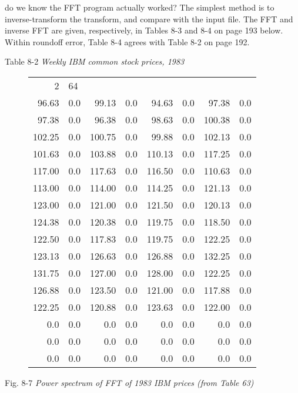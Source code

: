  do we know the FFT program actually worked? The simplest method is to inverse-transform the transform, and compare with the input file. The FFT and inverse FFT are given, respectively, in Tables 8-3 and 8-4 on page 193 below. Within roundoff error, Table 8-4 agrees with Table 8-2 on page 192.

Table 8-2 \textit{Weekly IBM common stock prices, 1983}
\begin{figure}
    \setlength{\tabcolsep}{1em}
    \begin{tabular}{rlrlrlrl}
             2 & 64  &        &     &        &     &        &     \\
         96.63 & 0.0 &  99.13 & 0.0 &  94.63 & 0.0 &  97.38 & 0.0 \\
         97.38 & 0.0 &  96.38 & 0.0 &  98.63 & 0.0 & 100.38 & 0.0 \\
        102.25 & 0.0 & 100.75 & 0.0 &  99.88 & 0.0 & 102.13 & 0.0 \\
        101.63 & 0.0 & 103.88 & 0.0 & 110.13 & 0.0 & 117.25 & 0.0 \\
        117.00 & 0.0 & 117.63 & 0.0 & 116.50 & 0.0 & 110.63 & 0.0 \\
        113.00 & 0.0 & 114.00 & 0.0 & 114.25 & 0.0 & 121.13 & 0.0 \\
        123.00 & 0.0 & 121.00 & 0.0 & 121.50 & 0.0 & 120.13 & 0.0 \\
        124.38 & 0.0 & 120.38 & 0.0 & 119.75 & 0.0 & 118.50 & 0.0 \\
        122.50 & 0.0 & 117.83 & 0.0 & 119.75 & 0.0 & 122.25 & 0.0 \\
        123.13 & 0.0 & 126.63 & 0.0 & 126.88 & 0.0 & 132.25 & 0.0 \\
        131.75 & 0.0 & 127.00 & 0.0 & 128.00 & 0.0 & 122.25 & 0.0 \\
        126.88 & 0.0 & 123.50 & 0.0 & 121.00 & 0.0 & 117.88 & 0.0 \\
        122.25 & 0.0 & 120.88 & 0.0 & 123.63 & 0.0 & 122.00 & 0.0 \\
           0.0 & 0.0 &    0.0 & 0.0 &    0.0 & 0.0 &    0.0 & 0.0 \\
           0.0 & 0.0 &    0.0 & 0.0 &    0.0 & 0.0 &    0.0 & 0.0 \\
           0.0 & 0.0 &    0.0 & 0.0 &    0.0 & 0.0 &    0.0 & 0.0
    \end{tabular}
    \label{table:08_02}
\end{figure}

Fig. 8-7 \textit{Power spectrum of FFT of 1983 IBM prices (from Table 63)}


